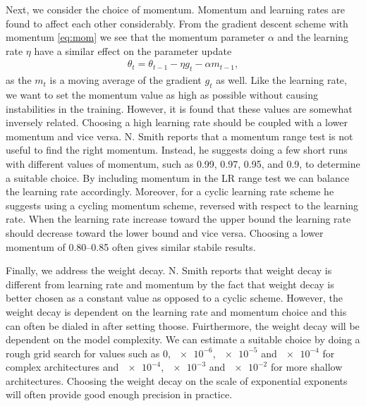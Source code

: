 Next, we consider the choice of momentum. Momentum and learning rates are found to affect each other considerably. From the gradient descent scheme with momentum \cref{eq:mom} we see that the momentum parameter $\alpha$ and the learning rate $\eta$ have a similar effect on the parameter update
\begin{align*}
  \theta_t = \theta_{t-1} - \eta g_t - \alpha m_{t-1},
\end{align*}
as the $m_t$ is a moving average of the gradient $g_t$ as well. Like the
learning rate, we want to set the momentum value as high as possible without
causing instabilities in the training. However, it is found that these values
are somewhat inversely related. Choosing a high learning rate should be coupled
with a lower momentum and vice versa. N. Smith \cite{smith2018disciplined}
reports that a momentum range test is not useful to find the right momentum.
Instead, he suggests doing a few short runs with different values of momentum,
such as 0.99, 0.97, 0.95, and 0.9, to determine a suitable choice. By including
momentum in the LR range test we can balance the learning rate accordingly.
Moreover, for a cyclic learning rate scheme he suggests using a cycling momentum
scheme, reversed with respect to the learning rate. When the
learning rate increase toward the upper bound the learning rate should
decrease toward the lower bound and vice versa. Choosing a lower momentum of
0.80--0.85 often gives similar stabile results.


Finally, we address the weight decay. N. Smith reports that weight decay is different from learning rate and momentum by the fact that weight decay is better chosen as a constant value as opposed to a cyclic scheme. However, the weight decay is dependent on the learning rate and momentum choice and this can often be dialed in after setting thoose. Fuirthermore, the weight decay will be dependent on the model complexity. We can estimate a suitable choice by doing a rough grid search for values such as 0, $\num{e-6}$, $\num{e-5}$ and $\num{e-4}$ for complex architectures and $\num{e-4}$, $\num{e-3}$ and $\num{e-2}$ for more shallow architectures. Choosing the weight decay on the scale of exponential exponents will often provide good enough precision in practice. 





